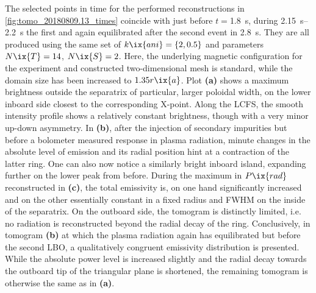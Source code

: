 %
            The selected points in time for the performed reconstructions in \cref{fig:tomo_20180809.13_times} coincide with just before $t=$\SI{1.8}{\second}, during \SIrange{2.15}{2.2}{\second} the first and again equilibrated after the second event in \SI{2.8}{\second}. They are all produced using the same set of $k\ix{ani}=\left\{2, 0.5\right\}$ and parameters $N\ix{T}=14$, $N\ix{S}=2$. Here, the underlying magnetic configuration for the experiment and constructed two-dimensional mesh is standard, while the domain size has been increased to $1.35r\ix{a}$. Plot \textbf{(a)} shows a maximum brightness outside the separatrix of particular, larger poloidal width, on the lower inboard side closest to the corresponding X-point. Along the LCFS, the smooth intensity profile shows a relatively constant brightness, though with a very minor up-down asymmetry. In \textbf{(b)}, after the injection of secondary impurities but before a bolometer measured response in plasma radiation, minute changes in the absolute level of emission and its radial position hint at a contraction of the latter ring. One can also now notice a similarly bright inboard island, expanding further on the lower peak from before. During the maximum in $P\ix{rad}$ reconstructed in \textbf{(c)}, the total emissivity is, on one hand significantly increased and on the other essentially constant in a fixed radius and FWHM on the inside of the separatrix. On the outboard side, the tomogram is distinctly limited, i.e. no radiation is reconstructed beyond the radial decay of the ring. Conclusively, in tomogram \textbf{(b)} at which the plasma radiation again has equilibrated but before the second LBO, a qualitatively congruent emissivity distribution is presented. While the absolute power level is increased slightly and the radial decay towards the outboard tip of the triangular plane is shortened, the remaining tomogram is otherwise the same as in \textbf{(a)}.\\%
